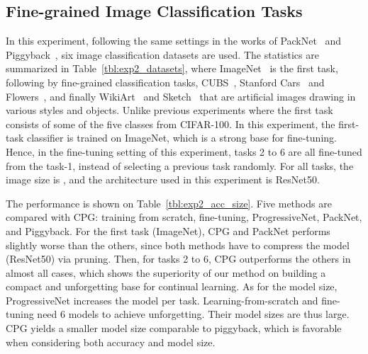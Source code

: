 \documentclass{article}
\begin{document}
\subsection{Fine-grained Image Classification Tasks}
In this experiment, following the same settings in the works of PackNet~\cite{mallya2018packnet} and Piggyback~\cite{Mallya2018PiggybackAA}, six image classification datasets are used.
The statistics are summarized in Table~\ref{tbl:exp2_datasets}, where ImageNet~\cite{krizhevsky2012imagenet} is the first task, following by fine-grained classification tasks, CUBS~\cite{WahCUB_200_2011}, Stanford Cars~\cite{StanfordCarsLi} and Flowers~\cite{Nilsback08}, and finally WikiArt~\cite{saleh2015large} and Sketch~\cite{eitz2012humans} that are artificial images drawing in various styles and objects.
Unlike previous experiments where the first task consists of some of the five classes from CIFAR-100.
In this experiment, the first-task classifier is trained on ImageNet, which is a strong base for fine-tuning.
Hence, in the fine-tuning setting of this experiment, tasks 2 to 6 are all fine-tuned from the task-1, instead of selecting a previous task randomly.
For all tasks, the image size is , and the architecture used in this experiment is ResNet50.







The performance is shown on Table~\ref{tbl:exp2_acc_size}.
Five methods are compared with CPG: training from scratch, fine-tuning, ProgressiveNet, PackNet, and Piggyback.
For the first task (ImageNet), CPG and PackNet performs slightly worse than the others, since both methods have to compress the model (ResNet50) via pruning.
Then, for tasks 2 to 6, CPG outperforms the others in almost all cases, which shows the superiority of our method on building a compact and unforgetting base for continual learning.
As for the model size, ProgressiveNet increases the model per task.
Learning-from-scratch and fine-tuning need 6 models to achieve unforgetting.
Their model sizes are thus large.
CPG yields a smaller model size comparable to piggyback, which is favorable when considering both accuracy and model size. 




 
\end{document}
